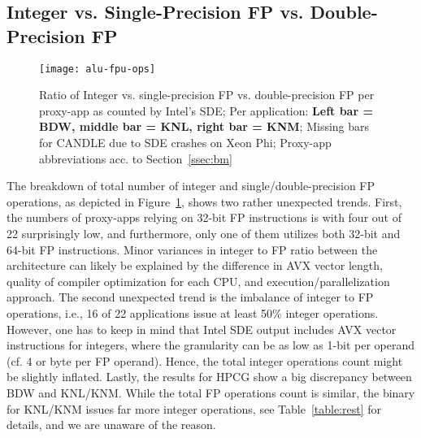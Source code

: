 \subsection{Integer vs. Single-Precision FP vs. Double-Precision FP}\label{ssec:eval_ops}
%
\begin{figure}[tbp]
    \centering
    \texttt{[image: alu-fpu-ops]}
    \caption{\label{fig:totalops} Ratio of Integer vs. single-precision FP vs. double-precision FP per proxy-app as counted by Intel's SDE; Per application: \textbf{Left bar = BDW, middle bar = KNL, right bar = KNM}; Missing bars for CANDLE due to SDE crashes on Xeon Phi; Proxy-app abbreviations acc. to Section~\ref{ssec:bm}}
\end{figure}
%
The breakdown of total number of integer and single/double-precision FP operations, as depicted in Figure~\ref{fig:totalops},
shows two rather unexpected trends. First, the numbers of proxy-apps relying on 32-bit FP instructions is with four out of 22
surprisingly low, and furthermore, only one of them utilizes both 32-bit and 64-bit FP instructions.
Minor variances in integer to FP ratio between the architecture can likely be explained by the difference in
AVX vector length, quality of compiler optimization for each CPU, and execution/parallelization approach.
The second unexpected trend is the imbalance of integer to FP operations, i.e., 16 of 22 applications issue at least 50\%
integer operations. However, one has to keep in mind that Intel SDE output includes AVX vector instructions for integers, where
the granularity can be as low as 1-bit per operand (cf. 4 or \unit[8]{byte} per FP operand). Hence, the total integer operations
count might be slightly inflated.
Lastly, the results for HPCG show a big discrepancy between BDW and KNL/KNM. While the total FP operations count is similar,
the binary for KNL/KNM issues far more integer operations, see Table~\ref{table:rest} for details, and we are unaware of the reason.

